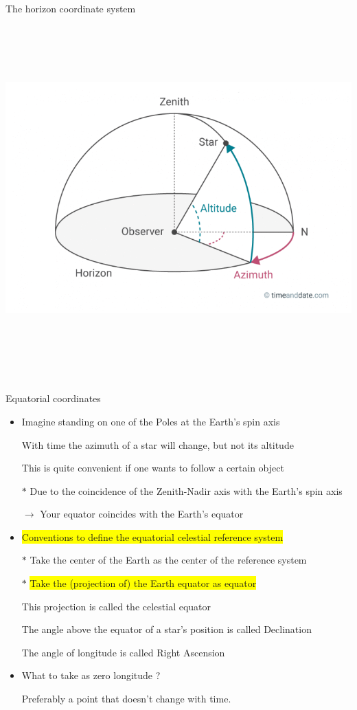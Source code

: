 \Tr
\onecolumn
\begin{center}
{\blue The horizon coordinate system}\\[3mm]
\includegraphics[keepaspectratio,height=14cm]{alt-azi}
\end{center}

\Tr
\onecolumn
\begin{center}
{\red Equatorial coordinates}
\end{center}
%
\begin{itemize}
\item Imagine standing on one of the Poles at the Earth's spin axis
\item[] With time the azimuth of a star will change, but not its altitude
\item[] This is quite convenient if one wants to follow a certain object
\item[$\ast$] Due to the coincidence of the Zenith-Nadir axis with the Earth's spin axis
\item[] $\rightarrow$ Your equator coincides with the Earth's equator
\item \colorbox{yellow}{Conventions to define the equatorial celestial reference system}
\item[$\ast$] {\blue Take the center of the Earth as the center of the reference system}
\item[$\ast$] \colorbox{yellow}{Take the (projection of) the Earth equator as equator}
\item[] This projection is called the {\blue celestial equator}
\item[] The {\blue angle above the equator} of a star's position is called {\blue Declination}
\item[] The angle of longitude is called {\blue Right Ascension}
\item {\red What to take as zero longitude ?}
\item[] Preferably a point that doesn't change with time.
\end{itemize}

